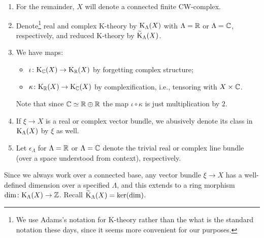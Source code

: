 \begin{notation}
  \begin{enumerate}[leftmargin=*]
  \item For the remainder, $X$ will denote a connected finite
    CW-complex.
  \item Denote\footnote{We use Adams's notation for K-theory rather
      than the what is the standard notation these days, since it
      seems more convenient for our purposes.} real and complex
    K-theory by $\mathrm{K}_\Lambda(X)$ with $\Lambda = \mathbb{R}$ or $\Lambda = \mathbb{C}$,
    respectively, and reduced K-theory by $\widetilde{\mathrm{K}}_\Lambda(X)$.
  \item We have maps:
    \begin{itemize}
    \item $\iota \colon \mathrm{K}_{\mathbb{C}}(X) \to \mathrm{K}_{\mathbb{R}}(X)$ by forgetting complex
      structure;
    \item $\kappa \colon \mathrm{K}_{\mathbb{R}}(X) \to \mathrm{K}_{\mathbb{C}}(X)$ by complexification, i.e.,
      tensoring with $X \times \mathbb{C}$.
    \end{itemize}
    Note that since $\mathbb{C} \simeq \mathbb{R} \oplus \mathbb{R}$ the map $\iota \circ
    \kappa$ is just multiplication by $2$.
  \item If $\xi \to X$ is a real or complex vector bundle, we
    abusively denote its class in $\mathrm{K}_\Lambda(X)$ by $\xi$ as well.
  \item Let $\epsilon_\Lambda$ for $\Lambda = \mathbb{R}$ or $\Lambda = \mathbb{C}$
    denote the trivial real or complex line bundle (over a space
    understood from context), respectively.
  \end{enumerate}
\end{notation}

\begin{remark}
  \label{dimension-welldefined}
  Since we always work over a connected base, any vector bundle $\xi
  \to X$ has a well-defined dimension over a specified $\Lambda$, and
  this extends to a ring morphism $\dim \colon \mathrm{K}_\Lambda(X) \to \mathbb{Z}$. Recall
  $\widetilde{\mathrm{K}}_\Lambda(X) = \ker(\dim)$.
\end{remark}

